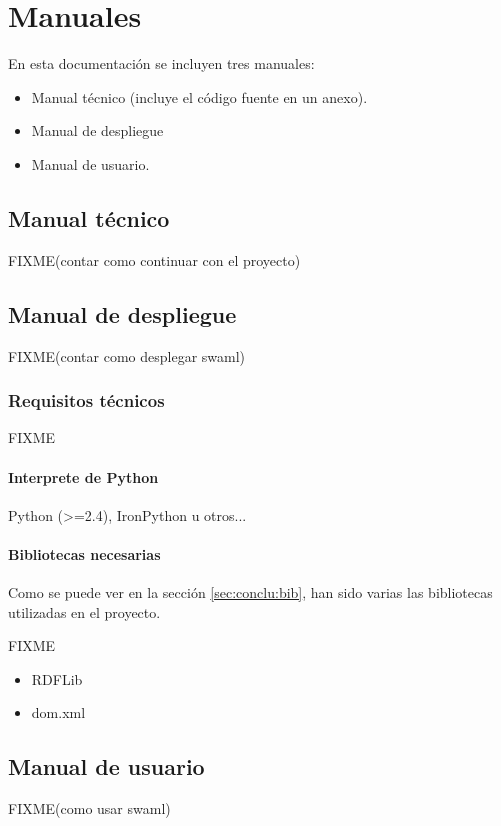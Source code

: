 
\chapter{Manuales}

En esta documentación se incluyen tres manuales:

\begin{itemize}
  \item Manual técnico (incluye el código fuente en un anexo).
  \item Manual de despliegue
  \item Manual de usuario.
\end{itemize}

\section{Manual técnico}

FIXME(contar como continuar con el proyecto)

\section{Manual de despliegue}

FIXME(contar como desplegar swaml)

\subsection*{Requisitos técnicos}

FIXME

\subsubsection{Interprete de Python}

Python (>=2.4), IronPython u otros...

\subsubsection{Bibliotecas necesarias}

Como se puede ver en la sección \ref{sec:conclu:bib}, han sido varias las
bibliotecas utilizadas en el proyecto.

FIXME

\begin{itemize}
  \item RDFLib
  \item dom.xml
\end{itemize}

\section{Manual de usuario}

FIXME(como usar swaml)
